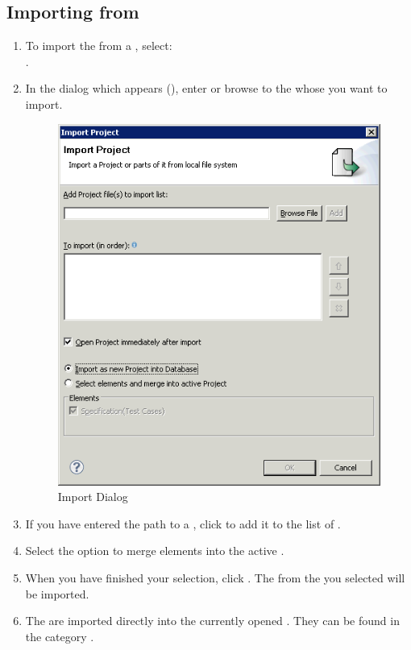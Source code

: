 \subsection{Importing \gdcases{} from \gdprojects{}}
\label{ImportTestCases}
\begin{enumerate}
\item To import the \gdcases{} from a \gdproject{}, select:\\
 . 
\item In the dialog which appears (), enter or browse to the \gdprojects{} whose \gdcases{} you want to import. 


\begin{figure} [htbp]
\begin{center}
\includegraphics{Tasks/Projects/PS/Import}
\caption{Import Dialog}
\label{Import}
\end{center}
\end{figure}

\item If you have entered the path to a \gdproject{}, click  to add it to the list of \gdprojects{}.  


\item Select the option to  merge elements into the active \gdproject{}. 
\item When you have finished your selection, click . The \gdcases{} from the \gdproject{} you selected will be imported.
\item The \gdcases{} are imported directly into the currently opened \gdproject{}. They can be found in the category . 
\end{enumerate}


